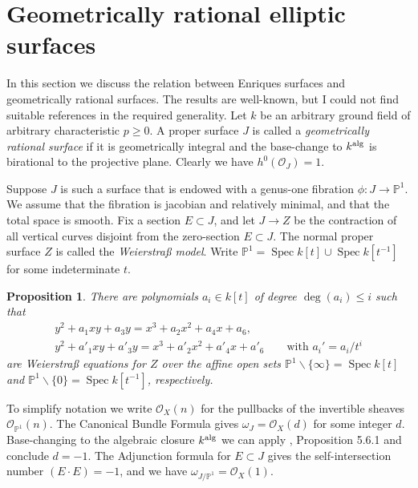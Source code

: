 \documentclass[oneside, 12pt]{amsart}
\newcommand\mylabel[1]{\label{#1}\marginpar{\vspace{-1ex}\medskip\medskip\footnotesize \tt #1}}
\renewcommand\mylabel[1]{\label{#1}}
\newtheorem{proposition}[theorem]{Proposition}
\theoremstyle{definition}
\theoremstyle{remark}
\newcommand{\PP}{\mathbb{P}}
\newcommand{\alg}{\text{\rm alg}}
\renewcommand{\O}{\mathscr{O}}
\newcommand{\ra}{\rightarrow}
\newcommand{\Spec}{\operatorname{Spec}}
\newcommand{\inv}{{-1}}
\begin{document}
\section{Geometrically rational elliptic surfaces}
\mylabel{Geometrically rational}

In this section we discuss the relation between Enriques surfaces and geometrically rational surfaces.
The results are well-known, but I could not find suitable references in the required generality.
Let $k$ be an arbitrary ground field of arbitrary characteristic $p\geq 0$.
A proper surface $J$ is called a \emph{geometrically rational surface} if it is   geometrically integral and the
base-change to $k^\alg$ is birational to the projective plane. Clearly we have $h^0(\O_J)=1$.

Suppose $J$ is such a surface that is  endowed with a   genus-one fibration $\phi:J\ra \PP^1$.
We assume that the fibration is jacobian and relatively minimal, and that the total space is smooth.
Fix a section $E\subset J$, and let $J\ra Z$ be the contraction of all vertical curves disjoint from the zero-section $E\subset J$.
The normal proper surface $Z$ is called the \emph{Weierstra\ss{} model}.
Write $\PP^1=\Spec k[t]\cup \Spec k[t^{-1}]$ for some indeterminate $t$.


\begin{proposition}
\mylabel{global weierstrass equations}
There are polynomials $a_i\in k[t]$ of degree $\deg(a_i)\leq i$
such that 
\begin{equation}
\label{two equations}
\begin{gathered}
y^2+a_1xy+a_3y=x^3+a_2x^2+a_4x+a_6,\\
y^2+a'_1xy+a'_3y=x^3+a'_2x^2+a'_4x+a'_6\qquad \text{with $a_i'=a_i/t^i$}
\end{gathered}
\end{equation}
are  Weierstra\ss{} equations for  $Z$ over the affine open sets $\PP^1\smallsetminus\{\infty\}=\Spec k[t]$
and $\PP^1\smallsetminus \{0\}=\Spec k[t^\inv]$, respectively.  
\end{proposition}

\proof
To simplify notation we write $\O_X(n)$ for the pullbacks of the invertible sheaves $\O_{\PP^1}(n)$.
The Canonical Bundle Formula \cite{Bombieri; Mumford 1977} gives $\omega_J=\O_X(d)$ for some integer $d$.
Base-changing to the algebraic closure $k^\alg$ we can apply \cite{Cossec; Dolgachev 1989}, Proposition 5.6.1 and conclude $d=-1$.
The Adjunction formula for $E\subset J$ gives the self-intersection number $(E\cdot E)=-1$,
and we have $\omega_{J/\PP^1}=\O_X(1)$.
\end{document}
